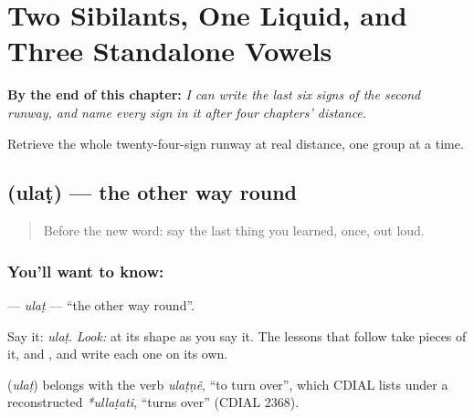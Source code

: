 
\chapter{Two Sibilants, One Liquid, and Three Standalone Vowels}
\label{ch:sibilant-runway}

\begin{chapteropening}
\textbf{By the end of this chapter:} \emph{I can write the last six signs of the second runway, and name every sign in it after four chapters' distance.}

Retrieve the whole twenty-four-sign runway at real distance, one group at a time.
\end{chapteropening}

\section[\texorpdfstring{\mr{उलट} (ulaṭ)}{उलट (ulaṭ)}]{ (ulaṭ) — the other way round}

\label{lesson:MR-C08-ulat}



\begin{quote}
Before the new word: say the last thing you learned, once, out loud.
\end{quote}

\subsection*{You'll want to know: }
\textbf{} — \emph{ulaṭ} — \textquotedblleft{}the other way round\textquotedblright{}.

Say it: \emph{ulaṭ}. \emph{Look:} at its shape as you say it. The lessons that follow take pieces of it, \textbf{} and \textbf{}, and write each one on its own.

\begin{cousinweb}
\textbf{} (\emph{ulaṭ}) belongs with the verb \emph{ulaṭṇẽ}, \textquotedblleft{}to turn over\textquotedblright{}, which CDIAL lists under a reconstructed \emph{*ullaṭati}, \textquotedblleft{}turns over\textquotedblright{} (CDIAL 2368).
\end{cousinweb}

